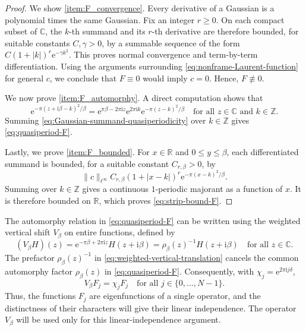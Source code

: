 \documentclass[11pt]{amsart}
\numberwithin{equation}{section}
\theoremstyle{definition}
\theoremstyle{remark}
\newcommand{\R}{\mathbb R}
\newcommand{\C}{\mathbb C}
\newcommand{\Z}{\mathbb Z}
\newcommand{\ii}{\mathrm i}
\newcommand{\e}{\mathrm e}
\begin{document}
\begin{proof}
    We show \eqref{item:F_convergence}. Every derivative of a Gaussian is a polynomial times the same Gaussian. Fix an integer $r\geq0$. On each compact subset of $\C$, the $k$-th summand and its $r$-th derivative are therefore bounded, for suitable constants $C,\gamma>0$, by a summable sequence of the form $C(1+|k|)^r\e^{-\gamma k^2}$. This proves normal convergence and term-by-term differentiation. Using the arguments surrounding \eqref{eq:nonframe-Laurent-function} for general $c$, we conclude that $F\equiv0$ would imply $c=0$. Hence, $F\not\equiv0$.
    
    We now prove \eqref{item:F_automorphy}. A direct computation shows that
    \begin{equation}\label{eq:Gaussian-summand-quasiperiodicity}
        \e^{-\pi(z+\ii\beta-k)^2/\beta}
        =\e^{\pi\beta-2\pi\ii z}\e^{2\pi\ii k}
        \e^{-\pi(z-k)^2/\beta}
        \quad\text{for all }z\in\C\text{ and }k\in\Z.
    \end{equation}
    Summing \eqref{eq:Gaussian-summand-quasiperiodicity} over $k\in\Z$ gives \eqref{eq:quasiperiod-F}.
    
    Lastly, we prove \eqref{item:F_bounded}. For $x\in\R$ and $0\leq y\leq\beta$, each differentiated summand is bounded, for a suitable constant $C_{r,\beta}>0$, by
    \begin{equation}\label{eq:differentiated-Gaussian-bound}
        \|c\|_{\ell^\infty}C_{r,\beta}
        (1+|x-k|)^r\e^{-\pi(x-k)^2/\beta}.
    \end{equation}
    Summing over $k\in\Z$ gives a continuous $1$-periodic majorant as a function of $x$. It is therefore bounded on $\R$, which proves \eqref{eq:strip-bound-F}.
\end{proof}

The automorphy relation in \eqref{eq:quasiperiod-F} can be written using the weighted vertical shift $V_\beta$ on entire functions, defined by
\begin{equation}\label{eq:weighted-vertical-translation}
    (V_\beta H)(z)=\e^{-\pi\beta+2\pi\ii z}H(z+\ii\beta)
    = \rho_\beta(z)^{-1} H(z+\ii\beta)
    \quad\text{for all }z\in\C.
\end{equation}
The prefactor $\rho_\beta(z)^{-1}$ in \eqref{eq:weighted-vertical-translation} cancels the common automorphy factor $\rho_\beta(z)$ in \eqref{eq:quasiperiod-F}. Consequently, with $\chi_j=\e^{2\pi\ii j\delta}$,
\begin{equation}\label{eq:V-eigenfunctions}
  V_\beta F_j=\chi_jF_j
  \quad\text{for all }j\in\{0,\ldots,N-1\}.
\end{equation}
Thus, the functions $F_j$ are eigenfunctions of a single operator, and the distinctness of their characters will give their linear independence. The operator $V_\beta$ will be used only for this linear-independence argument.
\end{document}
